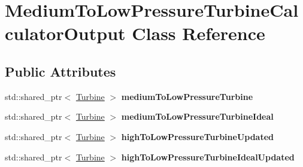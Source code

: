 \hypertarget{class_medium_to_low_pressure_turbine_calculator_output}{}\section{Medium\+To\+Low\+Pressure\+Turbine\+Calculator\+Output Class Reference}
\label{class_medium_to_low_pressure_turbine_calculator_output}
\subsection*{Public Attributes}
\begin{DoxyCompactItemize}
\item 
\mbox{\label{class_medium_to_low_pressure_turbine_calculator_output_af564c94a806e5a7ce03c5a871f3e2f17}} 
std\+::shared\+\_\+ptr$<$ \hyperlink{class_turbine}{Turbine} $>$ {\bfseries medium\+To\+Low\+Pressure\+Turbine}
\item 
\mbox{\label{class_medium_to_low_pressure_turbine_calculator_output_aab34e1b3e8209bea77001a7b9ee4eaad}} 
std\+::shared\+\_\+ptr$<$ \hyperlink{class_turbine}{Turbine} $>$ {\bfseries medium\+To\+Low\+Pressure\+Turbine\+Ideal}
\item 
\mbox{\label{class_medium_to_low_pressure_turbine_calculator_output_a3b43a7871880dfc0f7794e6eee794e1e}} 
std\+::shared\+\_\+ptr$<$ \hyperlink{class_turbine}{Turbine} $>$ {\bfseries high\+To\+Low\+Pressure\+Turbine\+Updated}
\item 
\mbox{\label{class_medium_to_low_pressure_turbine_calculator_output_abd70ab62bbe3c3b9c2995e5071cabafb}} 
std\+::shared\+\_\+ptr$<$ \hyperlink{class_turbine}{Turbine} $>$ {\bfseries high\+To\+Low\+Pressure\+Turbine\+Ideal\+Updated}
\end{DoxyCompactItemize}
